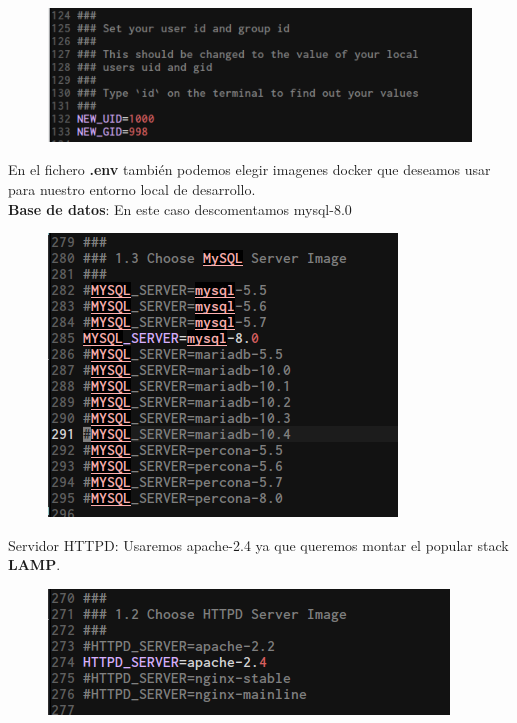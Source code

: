 \documentclass{article}
\begin{document}
\begin{figure}[h!]
  \centering
  \includegraphics[scale=0.75]{./Pictures/Devilbox/012_devilbox.png}
\end{figure}

En el fichero \textbf{.env} también podemos elegir imagenes docker que deseamos
usar para nuestro entorno local de desarrollo.\\

\textbf{Base de datos}: En este caso descomentamos mysql-8.0\\

\begin{figure}[h!]
  \centering
  \includegraphics[scale=0.75]{./Pictures/Devilbox/009_devilbox_mysql8.png}
\end{figure}

Servidor HTTPD: Usaremos apache-2.4 ya que queremos montar el popular stack
\textbf{LAMP}.\\

\begin{figure}[h!]
  \centering
  \includegraphics[scale=0.75]{./Pictures/Devilbox/010_devilbox_apache24.png}
\end{figure}
\end{document}
